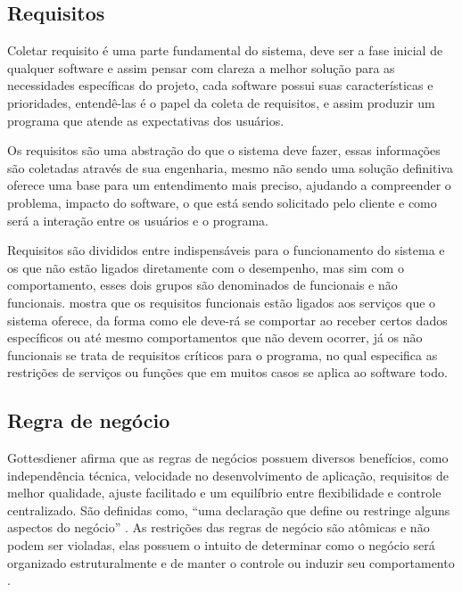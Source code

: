     \subsection{Requisitos}
        Coletar requisito é uma parte fundamental do sistema, deve ser a fase inicial de qualquer software e assim pensar com clareza a melhor solução para as necessidades específicas do projeto, cada software possui suas características e prioridades, entendê-las é o papel da coleta de requisitos, e assim produzir um programa que atende as expectativas dos usuários.

        Os requisitos são uma abstração do que o sistema deve fazer, essas informações são coletadas através de sua engenharia, mesmo não sendo uma solução definitiva oferece uma base para um entendimento mais preciso, ajudando a compreender o problema, impacto do software, o que está sendo solicitado pelo cliente e como será a interação entre os usuários e o programa\cite[p.~116]{presman6ed}.
    
        Requisitos são divididos entre indispensáveis para o funcionamento do sistema e os que não estão ligados diretamente com o desempenho, mas sim com o comportamento, esses dois grupos são denominados de funcionais e não funcionais.  mostra que os requisitos funcionais estão ligados aos serviços que o sistema oferece, da forma como ele deve-rá se comportar ao receber certos dados específicos ou até mesmo comportamentos que não devem ocorrer, já os não funcionais se trata de requisitos críticos para o programa, no qual especifica as restrições de serviços ou funções que em muitos casos se aplica ao software todo.


    \subsection{Regra de negócio}
        Gottesdiener  afirma que as regras de negócios possuem diversos benefícios, como independência técnica, velocidade no desenvolvimento de aplicação, requisitos de melhor qualidade, ajuste facilitado e um equilíbrio entre flexibilidade e controle centralizado. São definidas como, “uma declaração que define ou restringe alguns aspectos do negócio” \cite[p.~4]{the_business_rules_group_guide_2000}. As restrições das regras de negócio são atômicas e não podem ser violadas, elas possuem o intuito de determinar como o negócio será organizado estruturalmente e de manter o controle ou induzir seu comportamento \cite[p.~5]{the_business_rules_group_guide_2000}.

